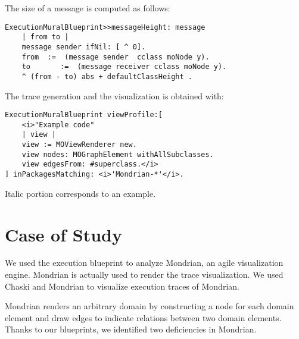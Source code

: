 \documentclass[10pt, conference, compsocconf]{IEEEtran}
\newcommand{\seclabel}[1]{\label{sec:#1}}
\begin{document}
The size of a message is computed as follows:
\begin{lstlisting}[]
ExecutionMuralBlueprint>>messageHeight: message
	| from to |
	message sender ifNil: [ ^ 0]. 
	from  :=  (message sender  cclass moNode y).
	to       :=  (message receiver cclass moNode y).
	^ (from - to) abs + defaultClassHeight .
\end{lstlisting}

The trace generation and the visualization is obtained with:

\begin{lstlisting}[]
ExecutionMuralBlueprint viewProfile:[
	<i>"Example code"
	| view |
	view := MOViewRenderer new.
	view nodes: MOGraphElement withAllSubclasses.
	view edgesFrom: #superclass.</i>
] inPackagesMatching: <i>'Mondrian-*'</i>.
\end{lstlisting}

Italic portion corresponds to an example.



\section{Case of Study}\seclabel{caseStudy}

We used the execution blueprint to analyze Mondrian, an agile visualization engine. Mondrian is actually used to render the trace visualization. We used Chaski and Mondrian to visualize execution traces of Mondrian.

Mondrian renders an arbitrary domain by constructing a node for each domain element and draw edges to indicate relations between two domain elements. Thanks to our blueprints, we identified two deficiencies in Mondrian. 
\end{document}
